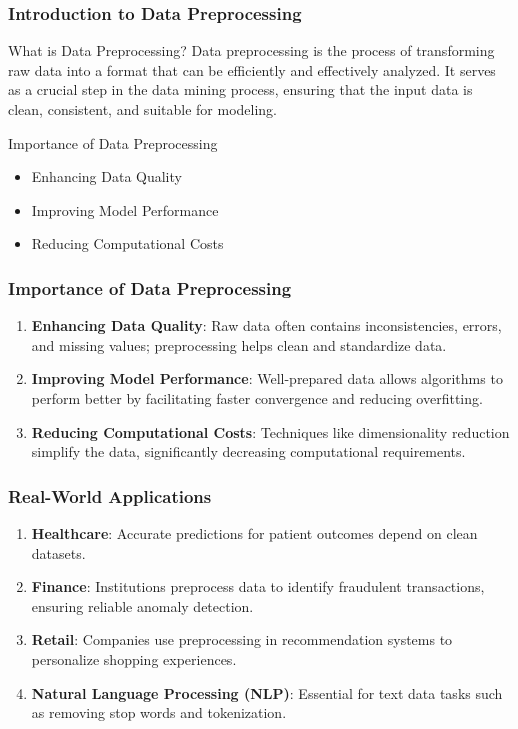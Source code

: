 \documentclass[aspectratio=169]{beamer}
\begin{document}
\frame{\titlepage}

\begin{frame}[fragile]
    \frametitle{Introduction to Data Preprocessing}
    \begin{block}{What is Data Preprocessing?}
        Data preprocessing is the process of transforming raw data into a format that can be efficiently and effectively analyzed. 
        It serves as a crucial step in the data mining process, ensuring that the input data is clean, consistent, and suitable for modeling.
    \end{block}
    \begin{block}{Importance of Data Preprocessing}
        \begin{itemize}
            \item Enhancing Data Quality
            \item Improving Model Performance
            \item Reducing Computational Costs
        \end{itemize}
    \end{block}
\end{frame}

\begin{frame}[fragile]
    \frametitle{Importance of Data Preprocessing}
    \begin{enumerate}
        \item \textbf{Enhancing Data Quality}: 
            Raw data often contains inconsistencies, errors, and missing values; preprocessing helps clean and standardize data.
        \item \textbf{Improving Model Performance}: 
            Well-prepared data allows algorithms to perform better by facilitating faster convergence and reducing overfitting.
        \item \textbf{Reducing Computational Costs}: 
            Techniques like dimensionality reduction simplify the data, significantly decreasing computational requirements.
    \end{enumerate}
\end{frame}

\begin{frame}[fragile]
    \frametitle{Real-World Applications}
    \begin{enumerate}
        \item \textbf{Healthcare}: Accurate predictions for patient outcomes depend on clean datasets.
        \item \textbf{Finance}: Institutions preprocess data to identify fraudulent transactions, ensuring reliable anomaly detection.
        \item \textbf{Retail}: Companies use preprocessing in recommendation systems to personalize shopping experiences.
        \item \textbf{Natural Language Processing (NLP)}: Essential for text data tasks such as removing stop words and tokenization.
    \end{enumerate}
\end{frame}
\end{document}
